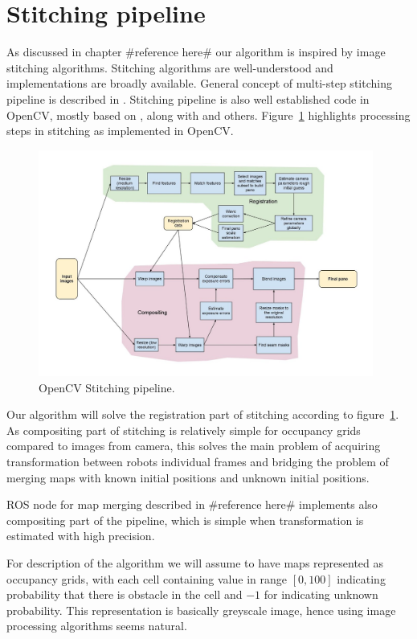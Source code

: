 \section{Stitching pipeline} %
\label{sec:stitching_pipeline}

As discussed in chapter \#reference here\# our algorithm is inspired by image stitching algorithms. Stitching algorithms are well-understood and implementations are broadly available. General concept of multi-step stitching pipeline is described in \cite{Brown2006}. Stitching pipeline is also well established code in OpenCV, mostly based on \cite{Brown2006}, along with \cite{Szeliski2004} \cite{Shum1998} and others. Figure~\ref{fig:opencv} highlights processing steps in stitching as implemented in OpenCV.

\begin{figure}
	\centering
	\includegraphics[width=4.33in]{../img/StitchingPipeline.jpg}
	\caption{OpenCV Stitching pipeline.}
	\label{fig:opencv}
\end{figure}

Our algorithm will solve the registration part of stitching according to figure~\ref{fig:opencv}. As compositing part of stitching is relatively simple for occupancy grids compared to images from camera, this solves the main problem of acquiring transformation between robots individual frames and bridging the problem of merging maps with known initial positions and unknown initial positions.

ROS node for map merging described in \#reference here\# implements also compositing part of the pipeline, which is simple when transformation is estimated with high precision.

For description of the algorithm we will assume to have maps represented as occupancy grids, with each cell containing value in range $[0,100]$ indicating probability that there is obstacle in the cell and $-1$ for indicating unknown probability. This representation is basically greyscale image, hence using image processing algorithms seems natural.

